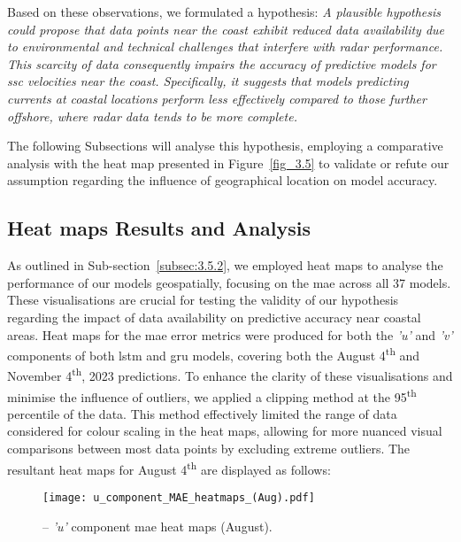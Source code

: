 Based on these observations, we formulated a hypothesis: \textit{A plausible hypothesis could propose that data points near the coast exhibit reduced data availability due to environmental and technical challenges that interfere with radar performance. This scarcity of data consequently impairs the accuracy of predictive models for \acrshort{ssc} velocities near the coast. Specifically, it suggests that models predicting currents at coastal locations perform less effectively compared to those further offshore, where radar data tends to be more complete.}

The following Subsections will analyse this hypothesis, employing a comparative analysis with the heat map presented in Figure~\ref{fig_3.5} to validate or refute our assumption regarding the influence of geographical location on model accuracy.

\subsection{Heat maps Results and Analysis}
\label{subsec:4.2.2}

As outlined in Sub-section~\ref{subsec:3.5.2}, we employed heat maps to analyse the performance of our models geospatially, focusing on the \acrshort{mae} across all 37 models. These visualisations are crucial for testing the validity of our hypothesis regarding the impact of data availability on predictive accuracy near coastal areas. Heat maps for the \acrshort{mae} error metrics were produced for both the \textit{'u'} and \textit{'v'} components of both \acrshort{lstm} and \acrshort{gru} models, covering both the August 4\textsuperscript{th} and November 4\textsuperscript{th}, 2023 predictions. To enhance the clarity of these visualisations and minimise the influence of outliers, we applied a clipping method at the 95\textsuperscript{th} percentile of the data. This method effectively limited the range of data considered for colour scaling in the heat maps, allowing for more nuanced visual comparisons between most data points by excluding extreme outliers. The resultant heat maps for August 4\textsuperscript{th} are displayed as follows:

\begin{figure}[htbp]
    \centering
    \texttt{[image: u\_component\_MAE\_heatmaps\_(Aug).pdf]}
    \caption[\textit{'u'} component MAE heat maps (August).]{-- \textit{'u'} component \acrshort{mae} heat maps (August).\label{fig_4.2}}
\end{figure}

